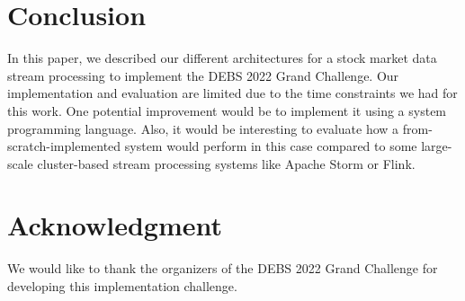 \documentclass[sigconf]{acmart}
\begin{document}



\maketitle








\section{Conclusion}\label{sec:conclustion}
In this paper, we described our different architectures for a stock market data stream processing to implement the DEBS 2022 Grand Challenge. Our implementation and evaluation are limited due to the time constraints we had for this work. One potential improvement would be to implement it using a system programming language. Also, it would be interesting to evaluate how a from-scratch-implemented system would perform in this case compared to some large-scale cluster-based stream processing systems like Apache Storm or Flink.

\section{Acknowledgment}
We would like to thank the organizers of the DEBS 2022 Grand Challenge for developing this implementation challenge.




\end{document}
